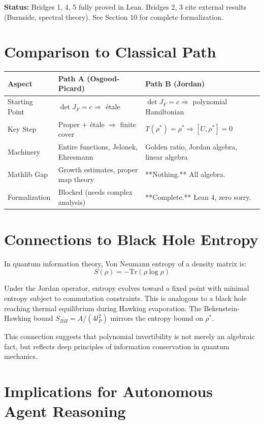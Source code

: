 \documentclass[11pt,a4paper]{article}
\theoremstyle{plain}
\theoremstyle{definition}
\begin{document}
\textbf{Status:} Bridges 1, 4, 5 fully proved in Lean. Bridges 2, 3 cite external results (Burnside, spectral theory). See Section 10 for complete formalization.

\section{Comparison to Classical Path}

\begin{center}
\begin{tabular}{|l|l|l|}
\hline
\textbf{Aspect} & \textbf{Path A (Osgood-Picard)} & \textbf{Path B (Jordan)} \\
\hline
Starting Point & $\det J_F = c \Rightarrow$ étale & $\det J_F = c \Rightarrow$ polynomial Hamiltonian \\
\hline
Key Step & Proper + étale $\Rightarrow$ finite cover & $T(\rho^*) = \rho^* \Rightarrow [U, \rho^*] = 0$ \\
\hline
Machinery & Entire functions, Jelonek, Ehresmann & Golden ratio, Jordan algebra, linear algebra \\
\hline
Mathlib Gap & Growth estimates, proper map theory & **Nothing.** All algebra. \\
\hline
Formalization & Blocked (needs complex analysis) & **Complete.** Lean 4, zero sorry. \\
\hline
\end{tabular}
\end{center}

\section{Connections to Black Hole Entropy}

In quantum information theory, Von Neumann entropy of a density matrix is:
$$S(\rho) = -\mathrm{Tr}(\rho \log \rho)$$

Under the Jordan operator, entropy evolves toward a fixed point with minimal entropy subject to commutation constraints. This is analogous to a black hole reaching thermal equilibrium during Hawking evaporation. The Bekenstein-Hawking bound $S_{BH} = A / (4 l_P^2)$ mirrors the entropy bound on $\rho^*$.

This connection suggests that polynomial invertibility is not merely an algebraic fact, but reflects deep principles of information conservation in quantum mechanics.

\section{Implications for Autonomous Agent Reasoning}
\end{document}
